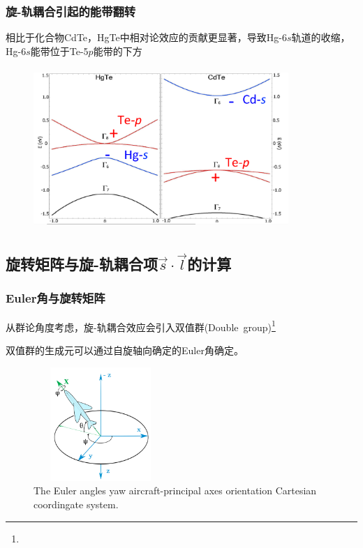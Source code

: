 \frame
{
	\frametitle{旋-轨耦合引起的能带翻转}
	相比于化合物\textrm{CdTe}，\textrm{HgTe}中相对论效应的贡献更显著，导致\textrm{Hg}-\textrm{6}$s$轨道的收缩，\textrm{Hg}-\textrm{6}$s$能带位于\textrm{Te}-\textrm{5}$p$能带的下方
	\begin{figure}[h!]
\centering
\vspace*{-0.05in}
\includegraphics[height=2.4in,width=3.80in,viewport=0 5 1350 830,clip]{Figures/SOC_double-group_2.png}
\label{Fig:Relativistic-Effect}
\end{figure}
}

\subsection{旋转矩阵与旋-轨耦合项$\vec s\cdot\vec l$的计算}
\frame
{
	\frametitle{\textrm{Euler}角与旋转矩阵}
	从群论角度考虑，旋-轨耦合效应会引入双值群\textrm{(Double~group)}\footnote{\fontsize{5.2pt}{6.2pt}}

	双值群的生成元可以通过自旋轴向确定的\textrm{Euler}角确定。

	{\fontsize{6.5pt}{4.2pt}}
	\begin{figure}[h!]
\centering
\vspace*{-0.21in}
\hspace*{-0.1in}
\includegraphics[height=1.7in,width=2.0in,viewport=2 5 1162 1180,clip]{Figures/euler-angles-yaw-aircraft-principal-axes-orientation-cartesian-coordinate-system.png}
\caption{\tiny \textrm{The Euler angles yaw aircraft-principal axes orientation Cartesian coordingate system.}}%
\label{Fig:Euler}
\end{figure}
}

